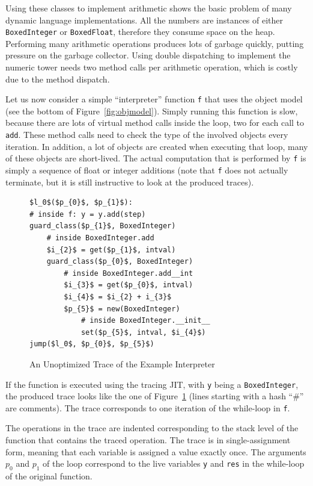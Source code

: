 \documentclass[preprint]{sigplanconf}
\begin{document}
Using these classes to implement arithmetic shows the basic problem of many
dynamic language implementations. All the numbers are instances of either
\lstinline{BoxedInteger} or \lstinline{BoxedFloat}, therefore they consume space on the
heap. Performing many arithmetic operations produces lots of garbage quickly,
putting pressure on the garbage collector. Using double dispatching to
implement the numeric tower needs two method calls per arithmetic operation,
which is costly due to the method dispatch.

Let us now consider a simple ``interpreter'' function \lstinline{f} that uses the
object model (see the bottom of Figure~\ref{fig:objmodel}).
Simply running this function is slow, because there are lots of virtual method
calls inside the loop, two for each
call to \lstinline{add}. These method calls need to check the type of the involved
objects every iteration. In addition, a lot of objects are created
when executing that loop, many of these objects are short-lived.
The actual computation that is performed by \lstinline{f} is simply a sequence of
float or integer additions (note that \lstinline{f} does not actually terminate,
but it is still instructive to look at the produced traces).


\begin{figure}
\begin{lstlisting}[mathescape,numbers = right,basicstyle=\setstretch{1.05}\ttfamily\scriptsize]
$l_0$($p_{0}$, $p_{1}$):
# inside f: y = y.add(step)
guard_class($p_{1}$, BoxedInteger)
    # inside BoxedInteger.add
    $i_{2}$ = get($p_{1}$, intval)
    guard_class($p_{0}$, BoxedInteger)
        # inside BoxedInteger.add__int
        $i_{3}$ = get($p_{0}$, intval)
        $i_{4}$ = $i_{2} + i_{3}$
        $p_{5}$ = new(BoxedInteger)
            # inside BoxedInteger.__init__
            set($p_{5}$, intval, $i_{4}$)
jump($l_0$, $p_{0}$, $p_{5}$)
\end{lstlisting}
\caption{An Unoptimized Trace of the Example Interpreter}
\label{fig:unopt-trace}
\end{figure}

If the function is executed using the tracing JIT, with \lstinline{y} being a
\lstinline{BoxedInteger}, the produced trace looks like the one of
Figure~\ref{fig:unopt-trace} (lines starting with a hash ``\#'' are comments).
The trace corresponds to one iteration of the while-loop in \lstinline{f}.

The operations in the trace are indented
corresponding to the stack level of the function that contains the traced
operation. The trace is in single-assignment form, meaning that each variable is
assigned a value exactly once. The arguments $p_0$ and $p_1$ of the loop correspond
to the live variables \lstinline{y} and \lstinline{res} in the while-loop of
the original function.
\end{document}
